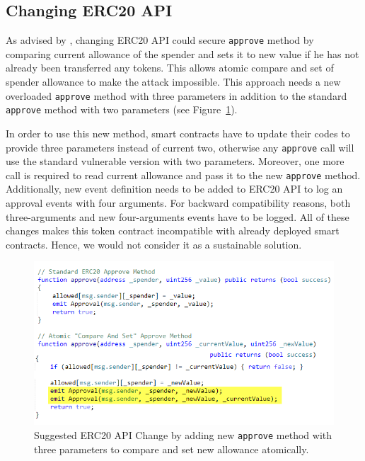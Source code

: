 \subsection{Changing ERC20 API}
As advised by \cite{Ref03}, changing ERC20 API could secure \texttt{approve} method by comparing current allowance of the spender and sets it to new value if he has not already been transferred any tokens. This allows atomic compare and set of spender allowance to make the attack impossible. This approach needs a new overloaded \texttt{approve} method with three parameters in addition to the standard \texttt{approve} method with two parameters (see Figure~\ref{fig:api}).

In order to use this new method, smart contracts have to update their codes to provide three parameters instead of current two, otherwise any \texttt{approve} call will use the standard vulnerable version with two parameters. Moreover, one more call is required to read current allowance and pass it to the new \texttt{approve} method. Additionally, new event definition needs to be added to ERC20 API to log an approval events with four arguments. For backward compatibility reasons, both three-arguments and new four-arguments events have to be logged. All of these changes makes this token contract incompatible with already deployed smart contracts. Hence, we would not consider it as a sustainable solution.
\begin{figure}[t]
	\centering
	\includegraphics[width=1.0\linewidth]{figures/multiple_withdrawal_12.png}
	\caption{Suggested ERC20 API Change by adding new \texttt{approve} method with three parameters to compare and set new allowance atomically.\label{fig:api}}
\end{figure}

